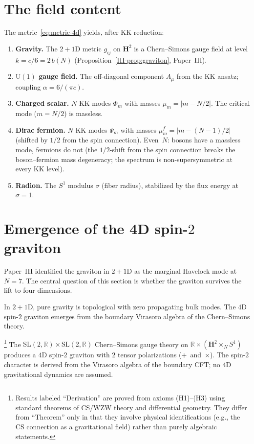 \section{The field content}
\label{sec:fields}

The metric~\eqref{eq:metric-4d} yields, after KK reduction:
\begin{enumerate}
\item \textbf{Gravity.}
  The $2{+}1$D metric $g_{ij}$ on $\mathbf{H}^2$ is a
  Chern--Simons gauge field at level
  $k = c/6 = 2\,b(N)$
  (Proposition~\ref{III-prop:graviton}, Paper~III).
\item \textbf{$\mathrm{U}(1)$ gauge field.}
  The off-diagonal component $A_\mu$ from the KK ansatz;
  coupling $\alpha = 6/(\pi c)$.
\item \textbf{Charged scalar.}
  $N$ KK modes $\Phi_m$ with masses $\mu_m = |m - N/2|$.
  The critical mode ($m = N/2$) is massless.
\item \textbf{Dirac fermion.}
  $N$ KK modes $\Psi_m$ with masses $\mu^f_m = |m - (N{-}1)/2|$
  (shifted by $1/2$ from the spin connection).
  Even~$N$: bosons have a massless mode, fermions do not
  (the $1/2$-shift from the spin connection breaks the
  boson--fermion mass degeneracy; the spectrum is
  non-supersymmetric at every KK level).
\item \textbf{Radion.}
  The $S^1$ modulus $\sigma$ (fiber radius), stabilized by
  the flux energy at $\sigma = 1$.
\end{enumerate}

\section{Emergence of the 4D spin-$2$ graviton}
\label{sec:graviton}

Paper~III identified the graviton in $2{+}1$D as the marginal
Havelock mode at $N = 7$.  The central question of this section
is whether the graviton survives the lift to four dimensions.

In $2{+}1$D, pure gravity is topological
\citep{Witten1988} with zero propagating bulk modes.
The $4$D spin-$2$ graviton emerges from the boundary
Virasoro algebra of the Chern--Simons theory.

\begin{derivation}%
\footnote{Results labeled ``Derivation'' are proved from axioms
(H1)--(H3) using standard theorems of CS/WZW theory and
differential geometry.
They differ from ``Theorem'' only in that they involve
physical identifications (e.g., the CS connection as a
gravitational field) rather than purely algebraic statements.}
\label{thm:graviton-4d}
The $\mathrm{SL}(2,\mathbb{R}) \times \mathrm{SL}(2,\mathbb{R})$
Chern--Simons gauge theory on
$\mathbb{R} \times (\mathbf{H}^2 \times_N S^1)$
produces a $4$D spin-$2$ graviton with $2$ tensor polarizations
($+$~and~$\times$).
The spin-$2$ character is derived from the Virasoro algebra
of the boundary CFT; no $4$D gravitational dynamics are assumed.
\end{derivation}

